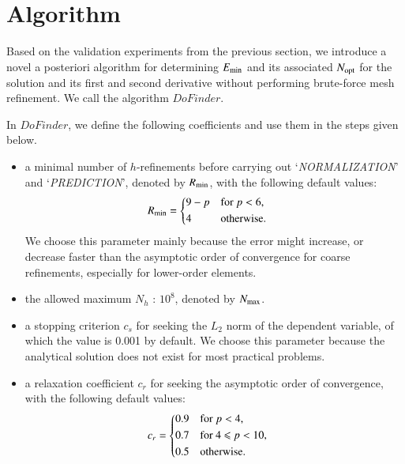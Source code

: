 \documentclass[review,3p]{elsarticle}
\begin{document}
\section{Algorithm}					\label{section_algorithm}


Based on the validation experiments from the previous section, we introduce a novel a posteriori algorithm for determining $E_{\rm min}$ and its associated $N_{\rm opt}$ for the solution and its first and second derivative without performing brute-force mesh refinement. We call the algorithm $DoFinder$.

In $DoFinder$, we define the following coefficients and use them in the steps given below.

\begin{itemize}
  \renewcommand\labelitemi{--}
  \item a minimal number of $h$-refinements before carrying out `\textit{NORMALIZATION}' and `\textit{PREDICTION}', denoted by $R_{\rm min}$, with the following default values:
  \begin{equation}
  \begin{aligned}
      R_{\rm min} &=
      \begin{cases*}
	9-p & for $p < 6$, \\
	4 & otherwise.
      \end{cases*}
  \end{aligned}
  \end{equation}
  We choose this parameter mainly because the error might increase, or decrease faster than the asymptotic order of convergence for coarse refinements, especially for lower-order elements.
  \item the allowed maximum $N_h$ : $10^8$, denoted by $N_{\rm max}$.  
  \item a stopping criterion $c_s$ for seeking the $L_2$ norm of the dependent variable, of which the value is 0.001 by default. We choose this parameter because the analytical solution does not exist for most practical problems.
  \item a relaxation coefficient $c_r$ for seeking the asymptotic order of convergence, with the following default values: 
    \begin{equation}
    \begin{aligned}
	c_r &=
	\begin{cases*}
	  0.9 & for $p<4$, \\
	  0.7 & for 4 $\leqslant$ $p < 10$, \\
	  0.5 & otherwise.
	\end{cases*}
    \end{aligned}
    \end{equation}
\end{itemize}
\end{document}
